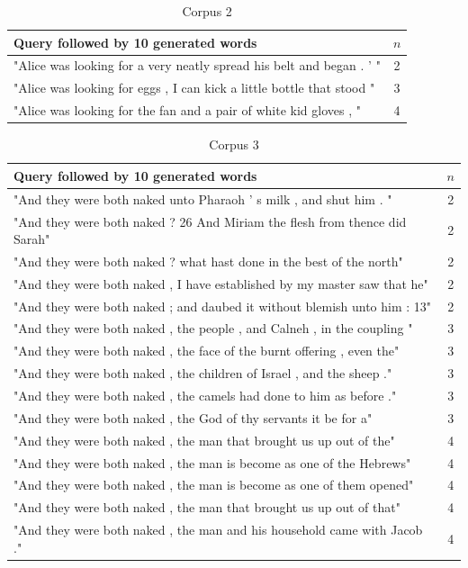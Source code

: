 \documentclass[a4paper,12pt]{article}
\begin{document}
\begin{table}
\begin{tabular}{| l |c|}
\hline
Query followed by 10 generated words & $n$ \\ \hline
"Alice was looking for a very neatly spread his belt and began . ' " & 2\\ \hline
"Alice was looking for eggs , I can kick a little bottle that stood "& 3 \\ \hline
"Alice was looking for the fan and a pair of white kid gloves , " & 4 \\ \hline
\end{tabular}
\caption{Corpus 2}
\label{tab:corpora1}
\end{table}

\begin{table}
\begin{tabular}{| l |c|}
\hline
Query followed by 10 generated words & $n$ \\ \hline
"And they were both naked unto Pharaoh ' s milk , and shut him . " & 2\\ \hline
"And they were both naked ? 26 And Miriam the flesh from thence did Sarah"& 2 \\ \hline
"And they were both naked ? what hast done in the best of the north" & 2 \\ \hline
"And they were both naked , I have established by my master saw that he" & 2 \\ \hline
"And they were both naked ; and daubed it without blemish unto him : 13" & 2 \\ \hline

"And they were both naked , the people , and Calneh , in the coupling " & 3 \\ \hline
"And they were both naked , the face of the burnt offering , even the" & 3 \\ \hline
"And they were both naked , the children of Israel , and the sheep ." & 3 \\ \hline
"And they were both naked , the camels had done to him as before ." & 3 \\ \hline
"And they were both naked , the God of thy servants it be for a" & 3 \\ \hline

"And they were both naked , the man that brought us up out of the" & 4 \\ \hline
"And they were both naked , the man is become as one of the Hebrews" & 4 \\ \hline
"And they were both naked , the man is become as one of them opened" & 4 \\ \hline
"And they were both naked , the man that brought us up out of that" & 4 \\ \hline
"And they were both naked , the man and his household came with Jacob ." & 4 \\ \hline

\end{tabular}
\caption{ Corpus 3}
\label{tab:corpora1}
\end{table}
\end{document}

